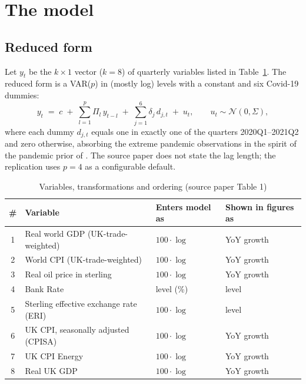 \section{The model}
\label{sec:model}

\subsection{Reduced form}

Let $y_t$ be the $k \times 1$ vector ($k=8$) of quarterly variables listed in Table~\ref{tab:variables}. The reduced form is a VAR($p$) in (mostly log) levels with a constant and six Covid-19 dummies:
\begin{equation}
y_t \;=\; c \;+\; \sum_{l=1}^{p} \Pi_l\, y_{t-l} \;+\; \sum_{j=1}^{6} \delta_j\, d_{j,t} \;+\; u_t,
\qquad u_t \sim \mathcal{N}(0, \Sigma),
\label{eq:var}
\end{equation}
where each dummy $d_{j,t}$ equals one in exactly one of the quarters 2020Q1--2021Q2 and zero otherwise, absorbing the extreme pandemic observations in the spirit of the pandemic prior of \citet{cascaldigarcia2022}. The source paper does not state the lag length; the replication uses $p=4$ as a configurable default.

\begin{table}[t]
\centering
\caption{Variables, transformations and ordering (source paper Table 1)}
\label{tab:variables}
\small
\begin{tabular}{clll}
\toprule
\# & Variable & Enters model as & Shown in figures as \\
\midrule
1 & Real world GDP (UK-trade-weighted) & $100\cdot\log$ & YoY growth \\
2 & World CPI (UK-trade-weighted)      & $100\cdot\log$ & YoY growth \\
3 & Real oil price in sterling         & $100\cdot\log$ & YoY growth \\
4 & Bank Rate                          & level (\%)     & level \\
5 & Sterling effective exchange rate (ERI) & $100\cdot\log$ & level \\
6 & UK CPI, seasonally adjusted (CPISA) & $100\cdot\log$ & YoY growth \\
7 & UK CPI Energy                      & $100\cdot\log$ & YoY growth \\
8 & Real UK GDP                        & $100\cdot\log$ & YoY growth \\
\bottomrule
\end{tabular}
\end{table}

